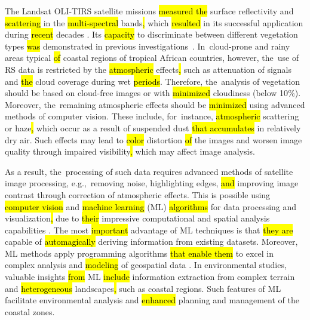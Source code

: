 \documentclass[coasts,article,accept,pdftex,oneauthor]{Definitions/mdpi}
\begin{document}
The Landsat OLI-TIRS satellite missions \hl{measured the} surface reflectivity and \hl{scattering} in the \hl{multi-spectral} bands\hl{,} {which \hl{resulted} in its successful application during \hl{recent} decades} \cite{WULDER2022113195}. Its \hl{capacity} to discriminate between different vegetation types \hl{was} demonstrated in previous investigations~\cite{Ferreira,Montfort,Fatoyinbo,Ribeiro}. In~cloud-prone and rainy areas typical \hl{of} coastal regions of tropical African countries, however, the~use of RS data is restricted by the \hl{atmospheric} effects\hl{,} such as attenuation of signals and \hl{the} cloud coverage during wet \hl{periods}. {Therefore, the~analysis of vegetation should be based on cloud-free images or with \hl{minimized} cloudiness (below 10}\%). {Moreover, the~remaining atmospheric effects should be \hl{minimized} using advanced methods of computer vision. These include, for~instance, \hl{atmospheric} scattering or haze\hl{,} which occur as a result of\hl{ }suspended dust \hl{that accumulates} in relatively dry air. Such effects may lead to \hl{color} distortion \hl{of} the images and worsen image quality through impaired visibility\hl{,} which may affect image analysis. }

As a result, the~processing of such data{ }requires advanced methods of satellite image processing{, e.g.,~removing noise, highlighting edges, \hl{and} improving image contrast through correction of atmospheric effects. This is possible using} \hl{computer vision} and \hl{machine learning} {(ML) } \hl{algorithms} for data processing and visualization\hl{,} {due to \hl{their} impressive computational and spatial analysis capabilities }\cite{LI2023104653,PHAM2023104501,HAN202387}. {The most \hl{important} advantage of ML techniques is that \hl{they are} capable of \hl{automagically} deriving information from\hl{ }existing datasets. Moreover, ML methods apply programming algorithms \hl{that enable them} to excel in complex analysis and \hl{modeling} of geospatial data} \cite{KHAN2022101678}. {In\hl{ }environmental studies, valuable insights \hl{from} ML \hl{include} information extraction from complex terrain and \hl{heterogeneous} landscapes\hl{,} such as coastal regions. Such features of ML facilitate environmental analysis and \hl{enhanced} planning and management of the coastal zones.}
\end{document}
